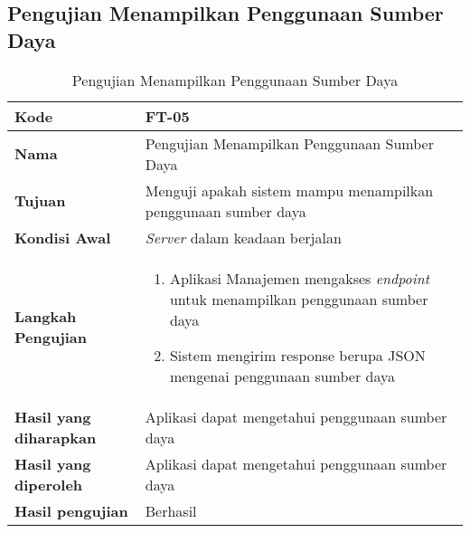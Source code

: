 \subsection{Pengujian Menampilkan Penggunaan Sumber Daya}
\begin{longtable}{|p{2.5cm}|p{6.5cm}|}
	\caption{Pengujian Menampilkan Penggunaan Sumber Daya} \label{t:uji_menampilkan_penggunaan_sumber_daya} \\ \hline
	\textbf{Kode} & FT-05 \\ \hline
	\textbf{Nama} & Pengujian Menampilkan Penggunaan Sumber Daya \\ \hline
	\textbf{Tujuan} & Menguji apakah sistem mampu menampilkan penggunaan sumber daya \\ \hline
	\textbf{Kondisi Awal} &  \textit{Server} dalam keadaan berjalan\\ \hline
	\textbf{Langkah Pengujian} &  
	\begin{enumerate}
		\item Aplikasi Manajemen mengakses \textit{endpoint} untuk menampilkan penggunaan sumber daya
		\item Sistem mengirim response berupa JSON mengenai penggunaan sumber daya
	\end{enumerate} \\ \hline
	\textbf{Hasil yang diharapkan} & Aplikasi dapat mengetahui penggunaan sumber daya \\ \hline
	\textbf{Hasil yang diperoleh} & Aplikasi dapat mengetahui penggunaan sumber daya \\ \hline
	\textbf{Hasil pengujian} & Berhasil \\ \hline
\end{longtable}
